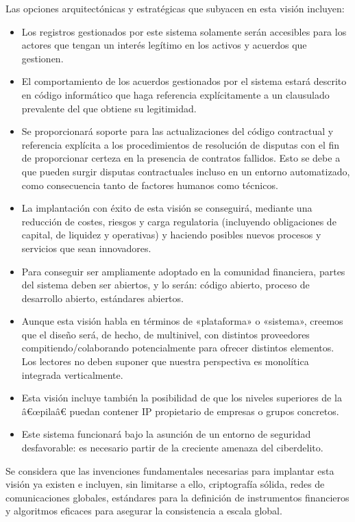 \documentclass{article}
\begin{document}
Las opciones arquitectónicas y estratégicas que subyacen en esta visión incluyen:
\begin{itemize} 
\item Los registros gestionados por este sistema solamente serán accesibles para los actores que tengan un interés legítimo en los activos y acuerdos que gestionen.
\item El comportamiento de los acuerdos gestionados por el sistema estará descrito en código informático que haga referencia explícitamente a un clausulado prevalente del que obtiene su legitimidad.
\item Se proporcionará soporte para las actualizaciones del código contractual y referencia explícita a los procedimientos de resolución de disputas con el fin de proporcionar certeza en la presencia de contratos fallidos. Esto se debe a que pueden surgir disputas contractuales incluso en un entorno automatizado, como consecuencia tanto de factores humanos como técnicos. 
\item La implantación con éxito de esta visión se conseguirá, mediante una reducción de costes, riesgos y carga regulatoria (incluyendo obligaciones de capital, de liquidez y operativas) y haciendo posibles nuevos procesos y servicios que sean innovadores.
\item Para conseguir ser ampliamente adoptado en la comunidad financiera, partes del sistema deben ser abiertos, y lo serán: código abierto, proceso de desarrollo abierto, estándares abiertos.
\item Aunque esta visión habla en términos de «plataforma» o «sistema», creemos que el diseño será, de hecho, de multinivel, con distintos proveedores compitiendo/colaborando potencialmente para ofrecer distintos elementos. Los lectores no deben suponer que nuestra perspectiva es monolítica integrada verticalmente.
\item Esta visión incluye también la posibilidad de que los niveles superiores de la â€œpilaâ€ puedan contener IP propietario de empresas o grupos concretos.
\item Este sistema funcionará bajo la asunción de un entorno de seguridad desfavorable: es necesario partir de la creciente amenaza del ciberdelito.
\end{itemize}

Se considera que las invenciones fundamentales necesarias para implantar esta visión ya existen e incluyen, sin limitarse a ello, criptografía sólida, redes de comunicaciones globales, estándares para la definición de instrumentos financieros y algoritmos eficaces para asegurar la consistencia a escala global. 
\end{document}
